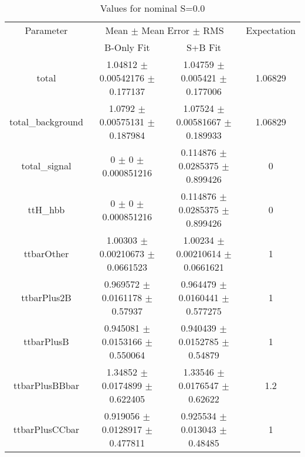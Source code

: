 \begin{table}
\centering
\caption{Values for nominal S=0.0}
\begin{tabular}{cccc}
\toprule
Parameter & \multicolumn{2}{c}{Mean $\pm$ Mean Error $\pm$ RMS} & Expectation\\
 & B-Only Fit & S+B Fit & \\
\midrule
total & \num{1.04812} $\pm$ \num{0.00542176} $\pm$ \num{0.177137} & \num{1.04759} $\pm$ \num{0.005421} $\pm$ \num{0.177006} & \num{1.06829}\\
total\_background & \num{1.0792} $\pm$ \num{0.00575131} $\pm$ \num{0.187984} & \num{1.07524} $\pm$ \num{0.00581667} $\pm$ \num{0.189933} & \num{1.06829}\\
total\_signal & \num{0} $\pm$ \num{0} $\pm$ \num{0.000851216} & \num{0.114876} $\pm$ \num{0.0285375} $\pm$ \num{0.899426} & \num{0}\\
ttH\_hbb & \num{0} $\pm$ \num{0} $\pm$ \num{0.000851216} & \num{0.114876} $\pm$ \num{0.0285375} $\pm$ \num{0.899426} & \num{0}\\
ttbarOther & \num{1.00303} $\pm$ \num{0.00210673} $\pm$ \num{0.0661523} & \num{1.00234} $\pm$ \num{0.00210614} $\pm$ \num{0.0661621} & \num{1}\\
ttbarPlus2B & \num{0.969572} $\pm$ \num{0.0161178} $\pm$ \num{0.57937} & \num{0.964479} $\pm$ \num{0.0160441} $\pm$ \num{0.577275} & \num{1}\\
ttbarPlusB & \num{0.945081} $\pm$ \num{0.0153166} $\pm$ \num{0.550064} & \num{0.940439} $\pm$ \num{0.0152785} $\pm$ \num{0.54879} & \num{1}\\
ttbarPlusBBbar & \num{1.34852} $\pm$ \num{0.0174899} $\pm$ \num{0.622405} & \num{1.33546} $\pm$ \num{0.0176547} $\pm$ \num{0.62622} & \num{1.2}\\
ttbarPlusCCbar & \num{0.919056} $\pm$ \num{0.0128917} $\pm$ \num{0.477811} & \num{0.925534} $\pm$ \num{0.013043} $\pm$ \num{0.48485} & \num{1}\\
\bottomrule
\end{tabular}
\end{table}
